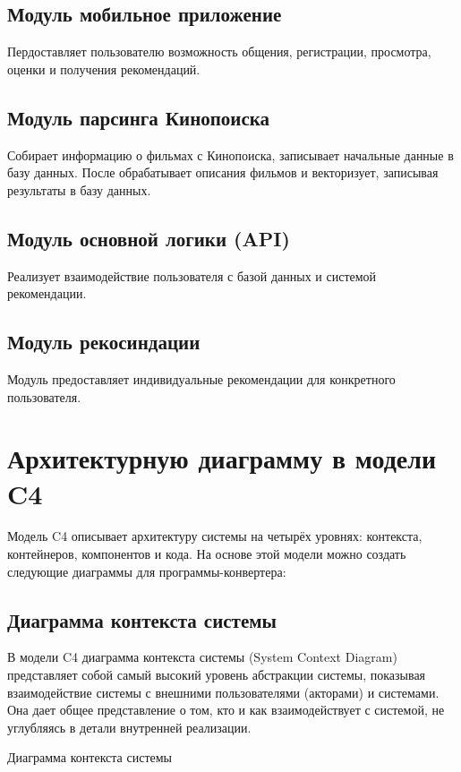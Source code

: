 \subsection{Модуль мобильное приложение}
Пердоставляет пользователю возможность общения, регистрации, просмотра, оценки и получения рекомендаций.

\subsection{Модуль парсинга Кинопоиска}
Собирает информацию о фильмах с Кинопоиска, записывает начальные данные в базу данных.
После обрабатывает описания фильмов и векторизует, записывая результаты в базу данных.

\subsection{Модуль основной логики (API)}
Реализует взаимодействие пользователя с базой данных и системой рекомендации.

\subsection{Модуль рекосиндации}
Модуль предоставляет индивидуальные рекомендации для конкретного пользователя.

\section{Архитектурную диаграмму в модели C4}
Модель C4 описывает архитектуру системы на четырёх уровнях:
контекста, контейнеров, компонентов и кода.
На основе этой модели можно создать следующие диаграммы
для программы-конвертера:

\subsection{Диаграмма контекста системы}
В модели C4 диаграмма контекста системы (System Context Diagram)
представляет собой самый высокий уровень абстракции системы,
показывая взаимодействие системы с внешними пользователями (акторами)
и системами.
Она дает общее представление о том,
кто и как взаимодействует с системой,
не углубляясь в детали внутренней реализации.

\begin{image}
    \caption{Диаграмма контекста системы}
    \label{fig:c4:system:context}
\end{image}

